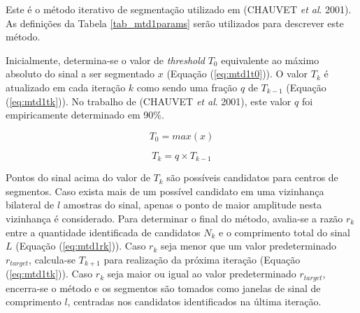 Este é o método iterativo de segmentação utilizado em (CHAUVET \emph{et al}. 2001). As definições da Tabela \ref{tab_mtd1params} serão utilizados para descrever este método.
\begin{table}[htb]
\end{table}

Inicialmente, determina-se o valor de \emph{threshold} $T_0$ equivalente ao máximo absoluto do sinal a ser segmentado $x$ (Equação (\ref{eq:mtd1t0})). O valor $T_k$ é atualizado em cada iteração $k$ como sendo uma fração $q$ de $T_{k-1}$ (Equação (\ref{eq:mtd1tk})). No trabalho de (CHAUVET \emph{et al}. 2001), este valor $q$ foi empiricamente determinado em 90\%.

\begin{equation}
\label{eq:mtd1t0}
  T_0 = max(x)
\end{equation}

\begin{equation}
\label{eq:mtd1tk}
  T_k = q \times T_{k-1}
\end{equation}

Pontos do sinal acima do valor de $T_k$ são possíveis candidatos para centros de segmentos. Caso exista mais de um possível candidato em uma vizinhança bilateral de $l$ amostras do sinal, apenas o ponto de maior amplitude nesta vizinhança é considerado. Para determinar o final do método, avalia-se a razão $r_k$ entre a quantidade identificada de candidatos $N_{k}$ e o comprimento total do sinal $L$ (Equação (\ref{eq:mtd1rk})). Caso $r_k$ seja menor que um valor predeterminado $r_{target}$, calcula-se $T_{k+1}$ para realização da próxima iteração (Equação (\ref{eq:mtd1tk})). Caso $r_k$ seja maior ou igual ao valor predeterminado $r_{target}$, encerra-se o método e os segmentos são tomados como janelas de sinal de comprimento $l$, centradas nos candidatos identificados na última iteração.

